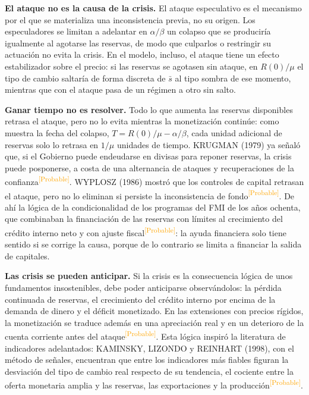 \documentclass[10pt,a4paper]{article}
\begin{document}
\textbf{El ataque no es la causa de la crisis.} El ataque especulativo es el mecanismo por el que se materializa una inconsistencia previa, no su origen. Los especuladores se limitan a adelantar en $\alpha/\beta$ un colapso que se produciría igualmente al agotarse las reservas, de modo que culparlos o restringir su actuación no evita la crisis. En el modelo, incluso, el ataque tiene un efecto estabilizador sobre el precio: si las reservas se agotasen sin ataque, en $R(0)/\mu$ el tipo de cambio saltaría de forma discreta de $\bar s$ al tipo sombra de ese momento, mientras que con el ataque pasa de un régimen a otro sin salto.

\textbf{Ganar tiempo no es resolver.} Todo lo que aumenta las reservas disponibles retrasa el ataque, pero no lo evita mientras la monetización continúe: como muestra la fecha del colapso, $T=R(0)/\mu-\alpha/\beta$, cada unidad adicional de reservas solo lo retrasa en $1/\mu$ unidades de tiempo. KRUGMAN (1979) ya señaló que, si el Gobierno puede endeudarse en divisas para reponer reservas, la crisis puede posponerse, a costa de una alternancia de ataques y recuperaciones de la confianza\textcolor{orange}{\textsuperscript{[Probable]}}. WYPLOSZ (1986) mostró que los controles de capital retrasan el ataque, pero no lo eliminan si persiste la inconsistencia de fondo\textcolor{orange}{\textsuperscript{[Probable]}}. De ahí la lógica de la condicionalidad de los programas del FMI de los años ochenta, que combinaban la financiación de las reservas con límites al crecimiento del crédito interno neto y con ajuste fiscal\textcolor{orange}{\textsuperscript{[Probable]}}: la ayuda financiera solo tiene sentido si se corrige la causa, porque de lo contrario se limita a financiar la salida de capitales.

\textbf{Las crisis se pueden anticipar.} Si la crisis es la consecuencia lógica de unos fundamentos insostenibles, debe poder anticiparse observándolos: la pérdida continuada de reservas, el crecimiento del crédito interno por encima de la demanda de dinero y el déficit monetizado. En las extensiones con precios rígidos, la monetización se traduce además en una apreciación real y en un deterioro de la cuenta corriente antes del ataque\textcolor{orange}{\textsuperscript{[Probable]}}. Esta lógica inspiró la literatura de indicadores adelantados: KAMINSKY, LIZONDO y REINHART (1998), con el método de señales, encuentran que entre los indicadores más fiables figuran la desviación del tipo de cambio real respecto de su tendencia, el cociente entre la oferta monetaria amplia y las reservas, las exportaciones y la producción\textcolor{orange}{\textsuperscript{[Probable]}}.
\end{document}
